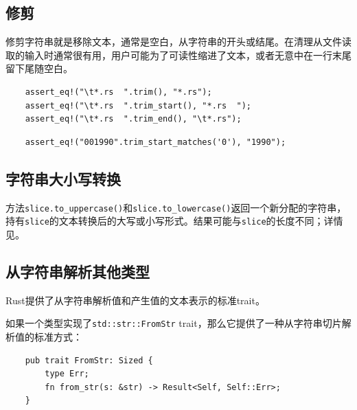 

\subsection{修剪}

修剪字符串就是移除文本，通常是空白，从字符串的开头或结尾。在清理从文件读取的输入时通常很有用，用户可能为了可读性缩进了文本，或者无意中在一行末尾留下尾随空白。

\begin{verbatim}
    assert_eq!("\t*.rs  ".trim(), "*.rs");
    assert_eq!("\t*.rs  ".trim_start(), "*.rs  ");
    assert_eq!("\t*.rs  ".trim_end(), "\t*.rs");
\end{verbatim}

\begin{verbatim}
    assert_eq!("001990".trim_start_matches('0'), "1990");
\end{verbatim}

\subsection{字符串大小写转换}

方法\texttt{slice.to\_uppercase()}和\texttt{slice.to\_lowercase()}返回一个新分配的字符串，持有\texttt{slice}的文本转换后的大写或小写形式。结果可能与\texttt{slice}的长度不同；详情见。
\subsection{从字符串解析其他类型}

Rust提供了从字符串解析值和产生值的文本表示的标准trait。

如果一个类型实现了\texttt{std::str::FromStr} trait，那么它提供了一种从字符串切片解析值的标准方式：
\begin{verbatim}
    pub trait FromStr: Sized {
        type Err;
        fn from_str(s: &str) -> Result<Self, Self::Err>;
    }
\end{verbatim}

